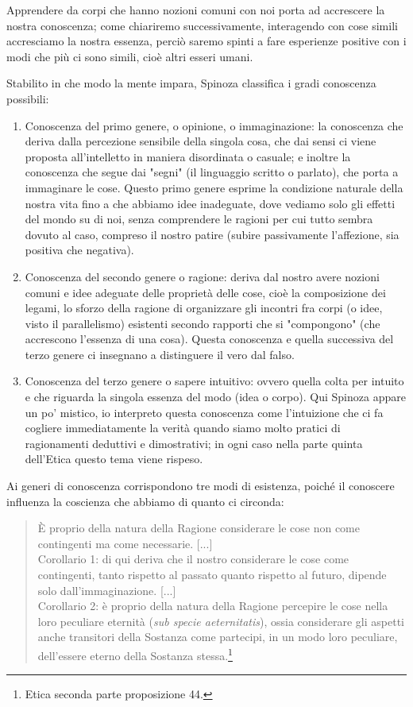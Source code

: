 Apprendere da corpi che hanno nozioni comuni con noi porta ad accrescere la nostra conoscenza; come chiariremo successivamente, interagendo con cose simili accresciamo la nostra essenza, perciò saremo spinti a fare esperienze positive con i modi che più ci sono simili, cioè altri esseri umani.

Stabilito in che modo la mente impara, Spinoza classifica i gradi conoscenza possibili:
\begin{enumerate}
	\item Conoscenza del primo genere, o opinione, o immaginazione: la conoscenza che deriva dalla percezione sensibile della singola cosa, che dai sensi ci viene proposta all’intelletto in maniera disordinata o casuale; e inoltre la conoscenza che segue dai "segni" (il linguaggio scritto o parlato), che porta a immaginare le cose. Questo primo genere esprime la condizione naturale della nostra vita fino a che abbiamo idee inadeguate, dove vediamo solo gli effetti del mondo su di noi, senza comprendere le ragioni per cui tutto sembra dovuto al caso, compreso il nostro patire (subire passivamente l'affezione, sia positiva che negativa).
	\item Conoscenza del secondo genere o ragione: deriva dal nostro avere nozioni comuni e idee adeguate delle proprietà delle cose, cioè la composizione dei legami, lo sforzo della ragione di organizzare gli incontri fra corpi (o idee, visto il parallelismo) esistenti secondo rapporti che si "compongono" (che accrescono l'essenza di una cosa). Questa conoscenza e quella successiva del terzo genere ci insegnano a distinguere il vero dal falso.
	\item Conoscenza del terzo genere o sapere intuitivo: ovvero quella colta per intuito e che riguarda la singola essenza del modo (idea o corpo). Qui Spinoza appare un po' mistico, io interpreto questa conoscenza come l'intuizione che ci fa cogliere immediatamente la verità quando siamo molto pratici di ragionamenti deduttivi e dimostrativi; in ogni caso nella parte quinta dell'Etica questo tema viene rispeso.
\end{enumerate}

Ai generi di conoscenza corrispondono tre modi di esistenza, poiché  il conoscere influenza la coscienza che abbiamo di quanto ci circonda:

\begin{quotation}
	\small È proprio della natura della Ragione considerare le cose non come contingenti ma come
	necessarie. [...]\\
 Corollario 1: di qui deriva che il nostro considerare le cose come contingenti, tanto
	rispetto al passato quanto rispetto al futuro, dipende solo dall’immaginazione. [...]\\Corollario 2: è proprio della natura della Ragione percepire le cose nella loro peculiare eternità (\textit{sub specie aeternitatis}), ossia considerare gli aspetti anche transitori della Sostanza come partecipi,
	in un modo loro peculiare, dell’essere eterno della Sostanza stessa.\footnote{Etica seconda parte proposizione 44.}
\end{quotation}

